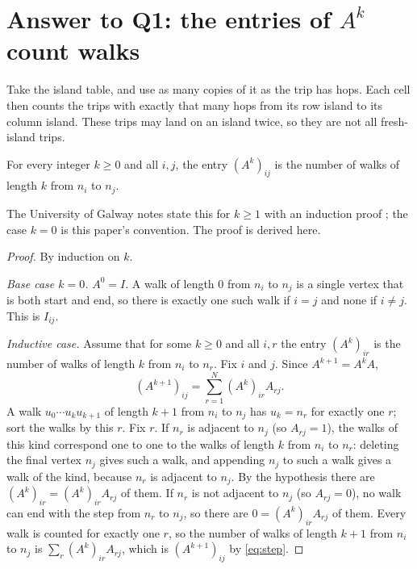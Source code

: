 \section{Answer to Q1: the entries of $A^k$ count walks}\label{sec:q1}

\plainwords{} Take the island table, and use as many copies of it as the trip has hops. Each cell then counts the trips with exactly that many hops from its row island to its column island. These trips may land on an island twice, so they are not all fresh-island trips.

\begin{theorem}\label{thm:counting}
For every integer $k\ge 0$ and all $i,j$, the entry $(A^k)_{ij}$ is the number
of walks of length $k$ from $n_i$ to $n_j$.
\end{theorem}
The University of Galway notes state this for $k\ge 1$ with an induction
proof \cite[Theorem~1.1.3, p.~4]{galwaynotes}; the case $k=0$ is this paper's
convention. The proof is derived here.
\begin{proof}
By induction on $k$.

\emph{Base case $k=0$.} $A^0=I$. A walk of length $0$ from $n_i$ to $n_j$ is a
single vertex that is both start and end, so there is exactly one such walk
if $i=j$ and none if $i\ne j$. This is $I_{ij}$.

\emph{Inductive case.} Assume that for some $k\ge 0$ and all $i,r$ the entry
$(A^k)_{ir}$ is the number of walks of length $k$ from $n_i$ to $n_r$. Fix $i$
and $j$. Since $A^{k+1}=A^kA$,
\begin{equation}\label{eq:step}
(A^{k+1})_{ij}=\sum_{r=1}^{N}(A^k)_{ir}A_{rj}.
\end{equation}
A walk $u_0\cdots u_ku_{k+1}$ of length $k+1$ from $n_i$ to $n_j$ has
$u_k=n_r$ for exactly one $r$; sort the walks by this $r$. Fix $r$.
If $n_r$ is adjacent to $n_j$ (so $A_{rj}=1$), the walks of this kind
correspond one to one to the walks of length $k$ from $n_i$ to $n_r$: deleting
the final vertex $n_j$ gives such a walk, and appending $n_j$ to such a walk
gives a walk of the kind, because $n_r$ is adjacent to $n_j$. By the
hypothesis there are $(A^k)_{ir}=(A^k)_{ir}A_{rj}$ of them. If $n_r$ is not
adjacent to $n_j$ (so $A_{rj}=0$), no walk can end with the step from $n_r$ to
$n_j$, so there are $0=(A^k)_{ir}A_{rj}$ of them. Every walk is counted for
exactly one $r$, so the number of walks of length $k+1$ from $n_i$ to $n_j$ is
$\sum_r(A^k)_{ir}A_{rj}$, which is $(A^{k+1})_{ij}$ by \cref{eq:step}.
\end{proof}

